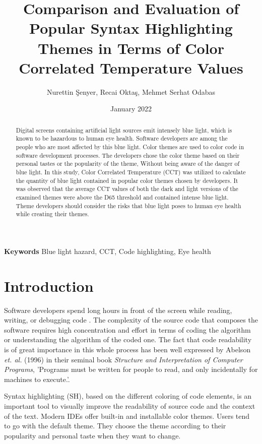 \documentclass{article}
\title{Comparison and Evaluation of Popular Syntax Highlighting Themes in Terms of Color Correlated Temperature Values}
\author{Nurettin Şenyer, Recai Oktaş, Mehmet Serhat Odabas}
\date{January 2022}
\begin{document}
\maketitle

\begin{abstract}
Digital screens containing artificial light sources emit intensely blue light, which is known to be hazardous to human eye health. Software developers are among the people who are most affected by this blue light. Color themes are used to color code in software development processes. The developers chose the color theme based on their personal tastes or the popularity of the theme, Without being aware of the danger of blue light. In this study, Color Correlated Temperature (CCT) was utilized to calculate the quantity of blue light contained in popular color themes chosen by developers. It was observed that the average CCT values of both the dark and light versions of the examined themes were above the D65 threshold and contained intense blue light. Theme developers should consider the risks that blue light poses to human eye health while creating their themes.
\end{abstract}

\textbf{Keywords} Blue light hazard, CCT, Code highlighting, Eye health

\section{Introduction} \label{sec:introduction}

Software developers spend long hours in front of the screen while reading, writing, or debugging code \cite{vigliarolo2019report}. The complexity of the source code that composes the software requires high concentration and effort in terms of coding the algorithm or understanding the algorithm of the coded one.
The fact that code readability is of great importance in this whole process has been well expressed by Abelson \emph{et. al.} (1996) in their seminal book \emph{Structure and Interpretation of Computer Programs}, 'Programs must be written for people to read, and only incidentally for machines to execute.'\cite{abelson1996sicp}. 

Syntax highlighting (SH), based on the different coloring of code elements, is an important tool to visually improve the readability of source code and the context of the text. Modern IDEs offer built-in and installable color themes. Users tend to go with the default theme. They choose the theme according to their popularity and personal taste when they want to change.
\end{document}
